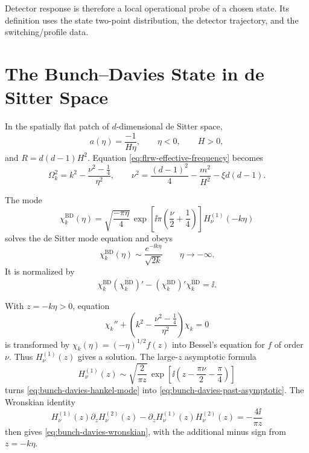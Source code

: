 Detector response is therefore a local operational probe of a chosen state.
Its definition uses the state two-point distribution, the detector trajectory,
and the switching/profile data.

\section{The Bunch--Davies State in de Sitter Space}

In the spatially flat patch of \(d\)-dimensional de Sitter space,
\begin{equation}
  a(\eta)=\frac{-1}{H\eta},
  \qquad
  \eta<0,
  \qquad
  H>0,
  \label{eq:de-sitter-flat-patch-scale-factor}
\end{equation}
and \(R=d(d-1)H^2\).  Equation
\eqref{eq:flrw-effective-frequency} becomes
\begin{equation}
  \Omega_k^2
  =
  k^2
  -
  \frac{\nu^2-\frac14}{\eta^2},
  \qquad
  \nu^2
  =
  \frac{(d-1)^2}{4}
  -
  \frac{m^2}{H^2}
  -
  \xi d(d-1).
  \label{eq:de-sitter-nu-definition}
\end{equation}

\begin{remark}
\label{rem:bunch-davies-hankel-modes}
The mode
\begin{equation}
  \chi_k^{\mathrm{BD}}(\eta)
  =
  \sqrt{\frac{-\pi\eta}{4}}\,
  \exp\!\left[\ii\pi\left(\frac{\nu}{2}+\frac14\right)\right]
  H_\nu^{(1)}(-k\eta)
  \label{eq:bunch-davies-hankel-mode}
\end{equation}
solves the de Sitter mode equation and obeys
\begin{equation}
  \chi_k^{\mathrm{BD}}(\eta)
  \sim
  \frac{e^{-\ii k\eta}}{\sqrt{2k}}
  \qquad
  \eta\to-\infty .
  \label{eq:bunch-davies-past-asymptotic}
\end{equation}
It is normalized by
\begin{equation}
  \chi_k^{\mathrm{BD}}\overline{(\chi_k^{\mathrm{BD}})'}
  -
  (\chi_k^{\mathrm{BD}})'\overline{\chi_k^{\mathrm{BD}}}
  =
  \ii.
  \label{eq:bunch-davies-wronskian}
\end{equation}
\end{remark}

With \(z=-k\eta>0\), equation
\[
  \chi_k''+
  \left(k^2-\frac{\nu^2-\frac14}{\eta^2}\right)\chi_k=0
  \]
is transformed by \(\chi_k(\eta)=(-\eta)^{1/2}f(z)\) into Bessel's equation
for \(f\) of order \(\nu\).  Thus \(H_\nu^{(1)}(z)\) gives a solution.
The large-\(z\) asymptotic formula
\[
  H_\nu^{(1)}(z)
  \sim
  \sqrt{\frac{2}{\pi z}}\,
  \exp\left[\ii\left(z-\frac{\pi\nu}{2}-\frac{\pi}{4}\right)\right]
  \]
turns \eqref{eq:bunch-davies-hankel-mode} into
\eqref{eq:bunch-davies-past-asymptotic}.  The Wronskian identity
\[
  H_\nu^{(1)}(z)\partial_zH_\nu^{(2)}(z)
  -
  \partial_zH_\nu^{(1)}(z)H_\nu^{(2)}(z)
  =
  -\frac{4\ii}{\pi z}
\]
then gives \eqref{eq:bunch-davies-wronskian}, with the additional minus sign
from \(z=-k\eta\).

